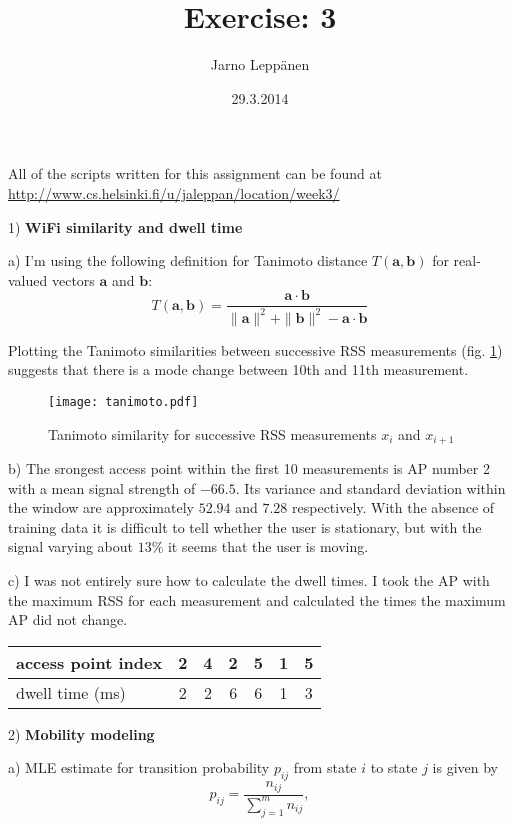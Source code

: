 \documentclass[a4paper,parskip=full]{scrartcl}
\author{Jarno Leppänen}
\title{Exercise: 3}
\date{29.3.2014}
\renewcommand{\vec}[1]{\mathbf{#1}}
\begin{document}
\maketitle

All of the scripts written for this assignment can be found at
\url{http://www.cs.helsinki.fi/u/jaleppan/location/week3/}

1) \textbf{WiFi similarity and dwell time}

  a) I'm using the following definition for Tanimoto distance
  $T(\vec{a}, \vec{b})$ for real-valued vectors $\vec{a}$ and
  $\vec{b}$\cite{chon2012automatically}:
  \begin{equation*}
    T(\vec{a}, \vec{b}) = \frac{\vec{a} \cdot \vec{b}}
        {\|\vec{a}\|^2 + \|\vec{b}\|^2 - \vec{a} \cdot \vec{b}}
  \end{equation*}

  Plotting the Tanimoto similarities between successive RSS measurements (fig.
  \ref{tanimoto}) suggests that there is a mode change between 10th and 11th
  measurement.
  \begin{figure}[ht!]
    \centering
    \texttt{[image: tanimoto.pdf]}
    \caption{Tanimoto similarity for successive RSS measurements $x_i$ and
      $x_{i+1}$}
    \label{tanimoto}
  \end{figure}

  b) The srongest access point within the first 10 measurements is AP number 2
  with a mean signal strength of $-66.5$. Its variance and standard deviation
  within the window are approximately $52.94$ and $7.28$ respectively. With the
  absence of training data it is difficult to tell whether the user is
  stationary, but with the signal varying about $13\%$ it seems that the user
  is moving.

  c) I was not entirely sure how to calculate the dwell times. I took the AP
  with the maximum RSS for each measurement and calculated the times the
  maximum AP did not change.

  \begin{tabular}{|l|c|c|c|c|c|c| }
    \hline
    access point index & 2 & 4 & 2 & 5 & 1 & 5 \\
    \hline
    dwell time (ms)    & 2 & 2 & 6 & 6 & 1 & 3 \\
    \hline
  \end{tabular}

2) \textbf{Mobility modeling}

  a) MLE estimate for transition probability $p_{ij}$ from state $i$ to state
  $j$ is given by\cite{markov2009note}
  \begin{equation*}
    p_{ij} = \frac{n_{ij}}{\sum^m_{j=1}n_{ij}},
  \end{equation*}
  
\end{document}

